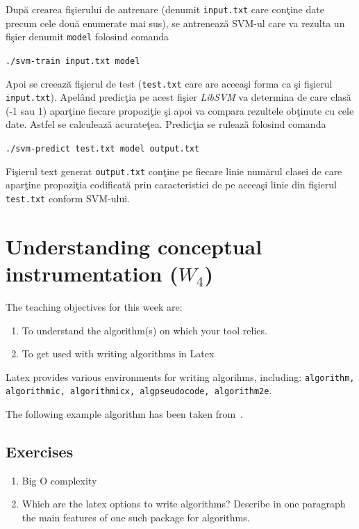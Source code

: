 \documentclass[a4paper,12pt]{report}
\begin{document}
  Dup\u a crearea fi\c sierului de antrenare (denumit \verb|input.txt| care con\c tine 
  date precum cele dou\u a enumerate mai sus), se antreneaz\u a SVM-ul care va rezulta 
  un fi\c sier denumit \verb+model+ folosind comanda
  
  \begin{center}
    \verb|./svm-train input.txt model|
  \end{center}
  
  \par
  Apoi se creeaz\u a fi\c sierul de test (\verb+test.txt+ care are 
  aceea\c si forma ca \c si fi\c sierul \verb|input.txt|).
  Apel\^and predic\c tia pe acest fi\c sier \textit{LibSVM} va determina de care clas\u a (-1 sau 1)
  apar\c tine fiecare propozi\c tie \c si apoi va compara rezultele ob\c tinute cu cele date. Astfel se 
  calculeaz\u a acurate\c tea. Predic\c tia se ruleaz\u a folosind comanda
  
  \begin{center}
    \verb|./svm-predict test.txt model output.txt|
  \end{center}

  \par
  Fi\c sierul text generat \verb+output.txt+ con\c tine pe fiecare linie num\u arul clasei de care apar\c tine 
  propozi\c tia codificat\u a prin caracteristici de pe aceea\c si linie din fi\c sierul
  \verb+test.txt+ conform SVM-ului.
  
  
  
  
  

 
\chapter{Understanding conceptual instrumentation ($W_4$)}
\label{ch:tool}


The teaching objectives for this week are:
\begin{enumerate}
 \item To understand the algorithm(s) on which your tool relies.
\item To get used with writing algorithms in Latex
\end{enumerate}

Latex provides various environments for writing algorihms, including: 
\texttt{algorithm, algorithmic, algorithmicx, algpseudocode, algorithm2e}.

The following example algorithm has been taken from~\cite{7034697}.


\section{Exercises}
\begin{enumerate}
 \item Big O complexity
 \item Which are the latex options to write algorithms? 
 Describe in one paragraph the main features of one such package for algorithms.
\end{enumerate}
\end{document}
